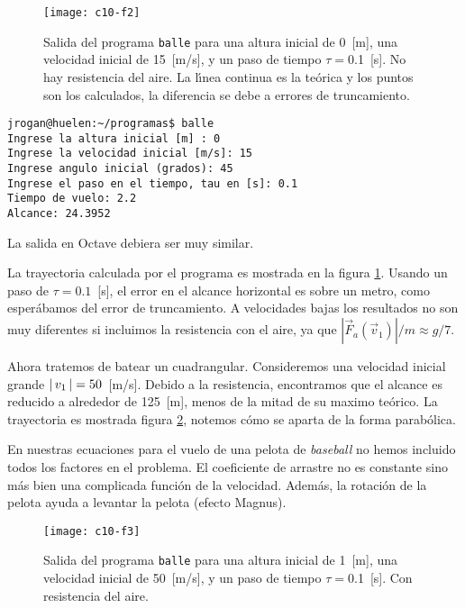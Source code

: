 \begin{figure}[!h]
\begin{center}
\texttt{[image: c10-f2]}
\caption{Salida del programa {\tt balle} para una altura inicial de
  0~[m], una velocidad inicial de 15~[m/s], y un paso de tiempo
  $\tau=$0.1~[s]. No hay resistencia del aire. La l{\'\i}nea continua es la
  te{\'o}rica y los puntos son los calculados, la diferencia se debe a
  errores de truncamiento.}\label{c10-f2}
\end{center}
\end{figure}
\begin{verbatim}
jrogan@huelen:~/programas$ balle
Ingrese la altura inicial [m] : 0
Ingrese la velocidad inicial [m/s]: 15
Ingrese angulo inicial (grados): 45
Ingrese el paso en el tiempo, tau en [s]: 0.1
Tiempo de vuelo: 2.2
Alcance: 24.3952
\end{verbatim}%
La salida en Octave debiera ser muy similar. 

La trayectoria calculada por el programa es mostrada en la figura
\ref{c10-f2}. Usando un paso de $\tau=0.1$~[s], el error en el alcance
horizontal es sobre un metro, como esper{\'a}bamos del error de
truncamiento. A velocidades bajas los resultados no son muy diferentes
si incluimos la resistencia con el aire, ya que $|\vec F_{a}(\vec
v_1)|/m\approx g/7$.

Ahora tratemos de batear un cuadrangular. Consideremos una velocidad
inicial grande $\left\lvert\, v_1 \,\right\lvert=50$~[m/s]. Debido a la resistencia,
encontramos que el alcance es reducido a alrededor de 125~[m], menos
de la mitad de su maximo te{\'o}rico. La trayectoria es mostrada figura
\ref{c10-f3}, notemos c\'omo se aparta de la forma parab{\'o}lica.

En nuestras ecuaciones para el vuelo de una pelota de {\em baseball}
no hemos incluido todos los factores en el problema. El coeficiente de
arrastre no es constante sino m{\'a}s bien una complicada funci{\'o}n de la
velocidad. Adem{\'a}s, la rotaci{\'o}n de la pelota ayuda a levantar la pelota
(efecto Magnus).

\begin{figure}[!h]
\begin{center}
\texttt{[image: c10-f3]}
\caption{Salida del programa {\tt balle} para una altura inicial de
  1~[m], una velocidad inicial de 50~[m/s], y un paso de tiempo
  $\tau=$0.1~[s]. Con resistencia del aire.}\label{c10-f3}
\end{center}
\end{figure}

